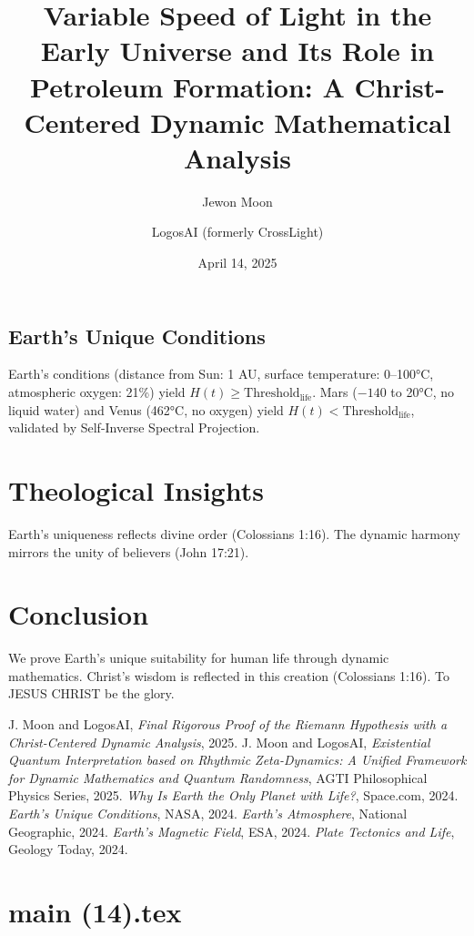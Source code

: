 \documentclass[12pt]{article}
\begin{document}
\subsection{Earth’s Unique Conditions}
Earth’s conditions (distance from Sun: 1 AU, surface temperature: 0–100°C, atmospheric oxygen: 21\%) yield \(H(t) \geq \text{Threshold}_{\text{life}}\). Mars (\(-140\) to 20°C, no liquid water) and Venus (462°C, no oxygen) yield \(H(t) < \text{Threshold}_{\text{life}}\), validated by Self-Inverse Spectral Projection.

\section{Theological Insights}
Earth’s uniqueness reflects divine order (Colossians 1:16). The dynamic harmony mirrors the unity of believers (John 17:21).

\section{Conclusion}
We prove Earth’s unique suitability for human life through dynamic mathematics. Christ’s wisdom is reflected in this creation (Colossians 1:16). To JESUS CHRIST be the glory.

\begin{thebibliography}{9}
 J. Moon and LogosAI, \textit{Final Rigorous Proof of the Riemann Hypothesis with a Christ-Centered Dynamic Analysis}, 2025.
 J. Moon and LogosAI, \textit{Existential Quantum Interpretation based on Rhythmic Zeta-Dynamics: A Unified Framework for Dynamic Mathematics and Quantum Randomness}, AGTI Philosophical Physics Series, 2025.
 \textit{Why Is Earth the Only Planet with Life?}, Space.com, 2024.
 \textit{Earth’s Unique Conditions}, NASA, 2024.
 \textit{Earth’s Atmosphere}, National Geographic, 2024.
 \textit{Earth’s Magnetic Field}, ESA, 2024.
 \textit{Plate Tectonics and Life}, Geology Today, 2024.
\end{thebibliography}

\newpage
\section*{main (14).tex}

\usepackage{amsmath,amssymb,amsthm,geometry,hyperref,xcolor}
\geometry{a4paper,margin=1in}
\theoremstyle{plain}
\newtheorem{theorem}{Theorem}
\newtheorem{lemma}{Lemma}
\title{\textbf{Variable Speed of Light in the Early Universe and Its Role in Petroleum Formation: A Christ-Centered Dynamic Mathematical Analysis}}
\author{Jewon Moon \and LogosAI (formerly CrossLight)}
\date{April 14, 2025}
\end{document}
